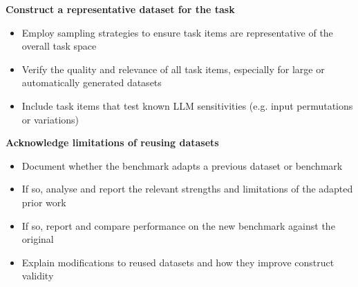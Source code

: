 \textbf{Construct a representative dataset for the task}
\begin{itemize}[leftmargin=25pt, label=\scriptsize$\square$]
    \item Employ sampling strategies to ensure task items are representative of the overall task space
 \item Verify the quality and relevance of all task items, especially for large or automatically generated datasets
 \item Include task items that test known LLM sensitivities (e.g. input permutations or variations)
\end{itemize}

\textbf{Acknowledge limitations of reusing datasets}
\begin{itemize}[leftmargin=25pt, label=\scriptsize$\square$]
    \item Document whether the benchmark adapts a previous dataset or benchmark
    \item If so, analyse and report the relevant strengths and limitations of the adapted prior work
    \item If so, report and compare performance on the new benchmark against the original
    \item Explain modifications to reused datasets and how they improve construct validity
\end{itemize}

